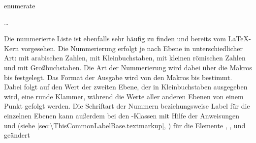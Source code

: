   \begin{Declaration}
    \begin{Environment}{enumerate}
      \begin{Body}
         \dots
        \BodyDots
      \end{Body}
    \end{Environment}
  \end{Declaration}%
  Die nummerierte
  Liste ist ebenfalls sehr häufig zu finden und
  bereits vom {\LaTeX}-Kern vorgesehen. Die Nummerierung
  erfolgt je nach Ebene in unterschiedlicher Art: mit arabischen Zahlen, mit
  Kleinbuchstaben, mit kleinen römischen Zahlen und mit Großbuchstaben. Die
  Art der Nummerierung wird dabei über die Makros  bis
   festgelegt. Das Format der Ausgabe wird von den Makros
   bis  bestimmt. Dabei folgt auf den
  Wert der zweiten Ebene, der in Kleinbuchstaben ausgegeben wird, eine runde
  Klammer, während die Werte aller anderen Ebenen von einem Punkt gefolgt
  werden.
  Die
  Schriftart der Nummern beziehungsweise
  Label für die einzelnen Ebenen kann außerdem bei den \KOMAScript-Klassen mit
  Hilfe der Anweisungen  und
   (siehe
  \autoref{sec:\ThisCommonLabelBase.textmarkup},
  ) für die Elemente
  ,
  ,
   und
   geändert

